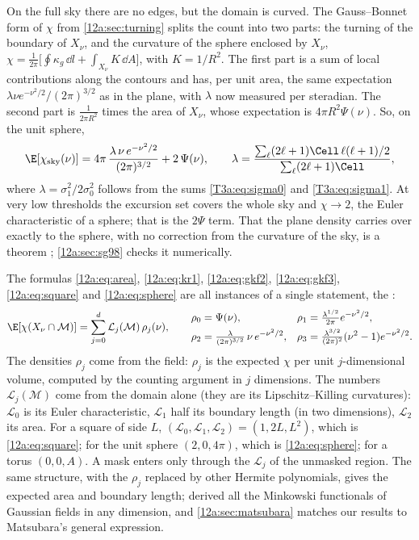 On the full sky there are no edges, but the domain is curved. The Gauss--Bonnet form of $\chi$ from
\cref{12a:sec:turning} splits the count into two parts: the turning of the boundary of $X_\nu$, and the
curvature of the sphere enclosed by $X_\nu$,
$\chi=\frac{1}{2\pi}\big[\oint\kappa_g\,\dd l+\int_{X_\nu}K\,\dd A\big]$, with $K=1/R^2$. The first part is a sum
of local contributions along the contours and has, per unit area, the same expectation
$\lambda\nu e^{-\nu^2/2}/(2\pi)^{3/2}$ as in the plane, with $\lambda$ now measured per steradian. The second
part is $\frac{1}{2\pi R^2}$ times the area of $X_\nu$, whose expectation is $4\pi R^2\Psi(\nu)$. So, on the
unit sphere,
\begin{equation}
  \E[\chi_{\rm sky}(\nu)]=4\pi\,\frac{\lambda\,\nu\,e^{-\nu^2/2}}{(2\pi)^{3/2}}+2\,\Psi(\nu) ,
  \qquad
  \lambda=\frac{\sum_\ell(2\ell+1)\Cell\,\ell(\ell+1)/2}{\sum_\ell(2\ell+1)\Cell} ,
  \label{12a:eq:sphere}
\end{equation}
where $\lambda=\sigma_1^2/2\sigma_0^2$ follows from the sums \eqref{T3a:eq:sigma0} and \eqref{T3a:eq:sigma1}.
At very low thresholds the excursion set covers the whole sky and $\chi\to2$, the Euler characteristic of a
sphere; that is the $2\Psi$ term. That the plane density carries over exactly to the sphere, with no
correction from the curvature of the sky, is a theorem \cite{AdlerTaylor2007}; \cref{12a:sec:sg98} checks it
numerically.

The formulas \eqref{12a:eq:area}, \eqref{12a:eq:kr1}, \eqref{12a:eq:gkf2}, \eqref{12a:eq:gkf3},
\eqref{12a:eq:square} and \eqref{12a:eq:sphere} are all instances of a single statement, the
 \cite{Adler1981,AdlerTaylor2007}:
\begin{equation}
  \E[\chi(X_\nu\cap\mathcal M)]=\sum_{j=0}^{d}\mathcal L_j(\mathcal M)\,\rho_j(\nu),
  \qquad
  \begin{aligned}
    \rho_0&=\Psi(\nu), & \rho_1&=\tfrac{\lambda^{1/2}}{2\pi}e^{-\nu^2/2},\\
    \rho_2&=\tfrac{\lambda}{(2\pi)^{3/2}}\,\nu\,e^{-\nu^2/2}, & \rho_3&=\tfrac{\lambda^{3/2}}{(2\pi)^2}(\nu^2-1)e^{-\nu^2/2}.
  \end{aligned}
  \label{12a:eq:gkf}
\end{equation}
The densities $\rho_j$ come from the field: $\rho_j$ is the expected $\chi$ per unit $j$-dimensional volume,
computed by the counting argument in $j$ dimensions. The numbers $\mathcal L_j(\mathcal M)$ come from the
domain alone (they are its Lipschitz--Killing curvatures): $\mathcal L_0$ is its Euler characteristic,
$\mathcal L_1$ half its boundary length (in two dimensions), $\mathcal L_2$ its area. For a square of side $L$,
$(\mathcal L_0,\mathcal L_1,\mathcal L_2)=(1,2L,L^2)$, which is \eqref{12a:eq:square}; for the unit sphere
$(2,0,4\pi)$, which is \eqref{12a:eq:sphere}; for a torus $(0,0,A)$. A mask enters only through the
$\mathcal L_j$ of the unmasked region. The same structure, with the $\rho_j$ replaced by other Hermite
polynomials, gives the expected area and boundary length; \cite{Tomita1986} derived all the Minkowski
functionals of Gaussian fields in any dimension, and \cref{12a:sec:matsubara} matches our results to
Matsubara's general expression.

